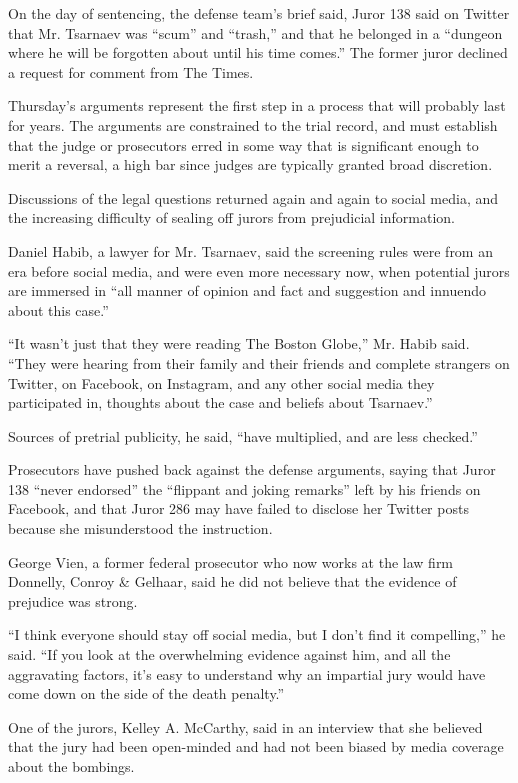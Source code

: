 On the day of sentencing, the defense team's brief said, Juror 138 said
on Twitter that Mr. Tsarnaev was ``scum'' and ``trash,'' and that he
belonged in a ``dungeon where he will be forgotten about until his time
comes.'' The former juror declined a request for comment from The Times.

Thursday's arguments represent the first step in a process that will
probably last for years. The arguments are constrained to the trial
record, and must establish that the judge or prosecutors erred in some
way that is significant enough to merit a reversal, a high bar since
judges are typically granted broad discretion.

Discussions of the legal questions returned again and again to social
media, and the increasing difficulty of sealing off jurors from
prejudicial information.

Daniel Habib, a lawyer for Mr. Tsarnaev, said the screening rules were
from an era before social media, and were even more necessary now, when
potential jurors are immersed in ``all manner of opinion and fact and
suggestion and innuendo about this case.''

``It wasn't just that they were reading The Boston Globe,'' Mr. Habib
said. ``They were hearing from their family and their friends and
complete strangers on Twitter, on Facebook, on Instagram, and any other
social media they participated in, thoughts about the case and beliefs
about Tsarnaev.''

Sources of pretrial publicity, he said, ``have multiplied, and are less
checked.''

Prosecutors have pushed back against the defense arguments, saying that
Juror 138 ``never endorsed'' the ``flippant and joking remarks'' left by
his friends on Facebook, and that Juror 286 may have failed to disclose
her Twitter posts because she misunderstood the instruction.

George Vien, a former federal prosecutor who now works at the law firm
Donnelly, Conroy \& Gelhaar, said he did not believe that the evidence
of prejudice was strong.

``I think everyone should stay off social media, but I don't find it
compelling,'' he said. ``If you look at the overwhelming evidence
against him, and all the aggravating factors, it's easy to understand
why an impartial jury would have come down on the side of the death
penalty.''

One of the jurors, Kelley A. McCarthy, said in an interview that she
believed that the jury had been open-minded and had not been biased by
media coverage about the bombings.

